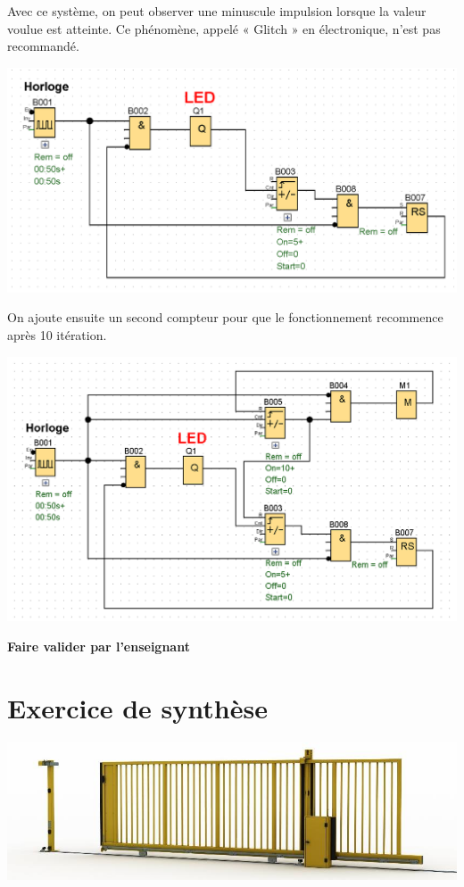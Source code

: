 \documentclass[11pt]{article}
\begin{document}
\begin{UPSTIactivite}

    Avec ce système, on peut observer une minuscule impulsion lorsque la valeur
voulue est atteinte. Ce phénomène, appelé « Glitch » en électronique, n’est pas recommandé.

\begin{center}
    \includegraphics[width=.5\textwidth]{images/compteur_2.png}
\end{center}

On ajoute ensuite un second compteur pour que le fonctionnement recommence après 10 itération. 


\begin{center}
    \includegraphics[width=.5\textwidth]{images/compteur_3.png}
\end{center}

\textbf{Faire valider par l'enseignant}
\end{UPSTIactivite}
\pagebreak
\section{Exercice de synthèse}
\begin{center}
    \includegraphics[width=.6\textwidth]{images/portail.jpg}
\end{center}
\end{document}
